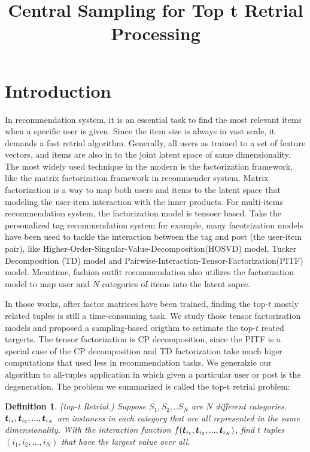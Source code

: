 \documentclass[letterpaper]{article}
\newcommand{\V}[1]{{\bm{{\MakeLowercase{#1}}}}}
\newtheorem{definition}{Definition}
\begin{document}
\title{Central Sampling for Top t Retrial Processing}
\date{}
\author{}
\maketitle

\section{Introduction}

In recommendation system,
it is an essential task to find the most relevant items when a specific user is given.
Since the item size is always in vast scale, it demands a fast retrial algorithm.
Generally, all users as trained to a set of feature vectors,
and items are also in to the joint latent space of same dimensionality.
The most widely used technique in the modern is the factorization framework,
like the matrix factorization framework in recommender system\cite{KoYe09}.
Matrix factorization is a way to map both users and items to the latent space
that modeling the user-item interaction with the inner products.
For multi-items recommendation system, the factorization model is tensoer based.
Take the personalized tag recommendation system for example,
many facotrization models have been used to tackle the interaction
between the tag and post (the user-item pair),
like Higher-Order-Singular-Value-Decomposition(HOSVD) model\cite{SyNa08},
Tucker Decomposition (TD) model\cite{Rendle_RTF} and
Pairwise-Interaction-Tensor-Factorization(PITF) model\cite{Rendle_PITF}.
Meantime, fashion outfit recommendation\cite{HuYiLa15} also utilizes the factorization model to
map user and $N$ categories of items into the latent sapce.

In those works, after factor matrices have been trained,
finding the top-$t$ mostly related tuples is still a time-consuming task.
We study those tensor factorization models and
proposed a sampling-based origthm to estimate the top-$t$ reated targerts.
The tensor factorization is CP decomposition,
since the PITF is a special case of the CP decomposition 
and TD factorization take much higer computations that used less in recommendation tasks.
We generalzie our algorithm to all-tuples application 
in which given a particular user or post is the degeneration.
The problem we summarized is called the top-t retrial problem:

\begin{definition}\label{def:DefinitionTopt}
(top-t Retrial.) Suppose $S_1,S_2,..S_N$ are $N$ different categories. $\V{t}_{i_1},\V{t}_{i_2},...,\V{t}_{i_N}$ are instances in each category that are all represented in the same dimensionality. With the interaction function $f(\V{t}_{i_1},\V{t}_{i_2},...,\V{t}_{i_N})$, find $t$ tuples $(i_1,i_2,...,i_N)$ that have the largest value over all.
\end{definition}
\end{document}
